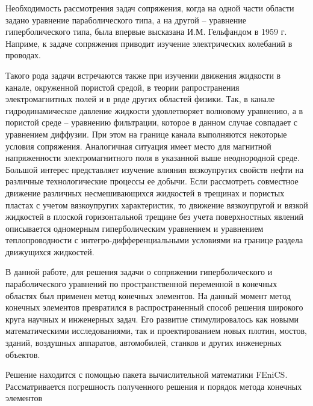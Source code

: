 \newpage

\begin{center}
\end{center}

Необходимость рассмотрения задач сопряжения, когда на одной части области задано уравнение параболического типа, а на другой -- уравнение гиперболического типа, была впервые высказана И.М. Гельфандом в 1959 г\cite{bib:gelfand}. Наприме, к задаче сопряжения приводит изучение электрических колебаний в проводах.

Такого рода задачи встречаются также при изучении движения жидкости в канале, окруженной пористой средой, в теории рапространения электромагнитных полей и в ряде других областей физики. Так, в канале гидродинамическое давление жидкости удовлетворяет волновому уравнению, а в пористой среде -- уравнению фильтрации, которое в данном случае совпадает с уравнением диффузии\cite{bib:leibezon}. При этом на границе канала выполняются некоторые условия сопряжения. Аналогичная ситуация имеет место для магнитной напряженности электромагнитного поля в указанной выше неоднородной среде\cite{bib:thomas}. Большой интерес представляет изучение влияния вязкоупругих свойств нефти на различные технологические процессы ее добычи. Если рассмотреть совместное движение различных несмешивающихся жидкостей в трещинах и пористых пластах с учетом вязкоупругих характеристик, то движение вязкоупругой и вязкой жидкостей в плоской горизонтальной трещине без учета поверхностных явлений описывается одномерным гиперболическим уравнением и уравнением теплопроводности с интегро-дифференциальными условиями на границе раздела движущихся жидкостей\cite{bib:gelfand}.

В данной работе, для решения задачи о сопряжении гиперболического и параболического уравнений по пространственной переменной в конечных областях был применен метод конечных элементов. 
На данный момент метод конечных элементов превратился в распространенный способ решения широкого круга научных и инженерных задач. Его развитие стимулировалось как новыми математическими исследованиями, так и проектированием новых плотин, мостов, зданий, воздушных аппаратов, автомобилей, станков и других инженерных объектов.\cite{bib:mke-introduction}

Решение находится с помощью пакета вычислительной математики FEniCS.
Рассматривается погрешность полученного решения и порядок метода конечных элементов


\newpage
